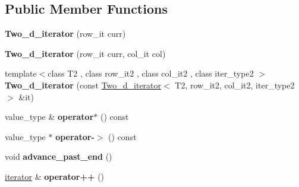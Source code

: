 \subsection*{Public Member Functions}
\begin{DoxyCompactItemize}
\item 
{\bfseries Two\+\_\+d\+\_\+iterator} (row\+\_\+it curr)\hypertarget{classspp___1_1_two__d__iterator_a7150f8c173d60e5778af4cc78cc0acb7}{}\label{classspp___1_1_two__d__iterator_a7150f8c173d60e5778af4cc78cc0acb7}

\item 
{\bfseries Two\+\_\+d\+\_\+iterator} (row\+\_\+it curr, col\+\_\+it col)\hypertarget{classspp___1_1_two__d__iterator_ae4c440f3cea9ba7a5343f772e17e8ad5}{}\label{classspp___1_1_two__d__iterator_ae4c440f3cea9ba7a5343f772e17e8ad5}

\item 
{\footnotesize template$<$class T2 , class row\+\_\+it2 , class col\+\_\+it2 , class iter\+\_\+type2 $>$ }\\{\bfseries Two\+\_\+d\+\_\+iterator} (const \hyperlink{classspp___1_1_two__d__iterator}{Two\+\_\+d\+\_\+iterator}$<$ T2, row\+\_\+it2, col\+\_\+it2, iter\+\_\+type2 $>$ \&it)\hypertarget{classspp___1_1_two__d__iterator_a4e0e37ac6947bc637b4f17098b5c8c2f}{}\label{classspp___1_1_two__d__iterator_a4e0e37ac6947bc637b4f17098b5c8c2f}

\item 
value\+\_\+type \& {\bfseries operator$\ast$} () const \hypertarget{classspp___1_1_two__d__iterator_ae5fc0ec499d0f252250e941a8cf22ebb}{}\label{classspp___1_1_two__d__iterator_ae5fc0ec499d0f252250e941a8cf22ebb}

\item 
value\+\_\+type $\ast$ {\bfseries operator-\/$>$} () const \hypertarget{classspp___1_1_two__d__iterator_abc152baac25977f1be0d60963f35b420}{}\label{classspp___1_1_two__d__iterator_abc152baac25977f1be0d60963f35b420}

\item 
void {\bfseries advance\+\_\+past\+\_\+end} ()\hypertarget{classspp___1_1_two__d__iterator_af832f86d2a9f4d0039a8a811f66818dd}{}\label{classspp___1_1_two__d__iterator_af832f86d2a9f4d0039a8a811f66818dd}

\item 
\hyperlink{classspp___1_1_two__d__iterator}{iterator} \& {\bfseries operator++} ()\hypertarget{classspp___1_1_two__d__iterator_a30127d8e2ef22d889a0038a3db0e8316}{}\label{classspp___1_1_two__d__iterator_a30127d8e2ef22d889a0038a3db0e8316}


\end{DoxyCompactItemize}
